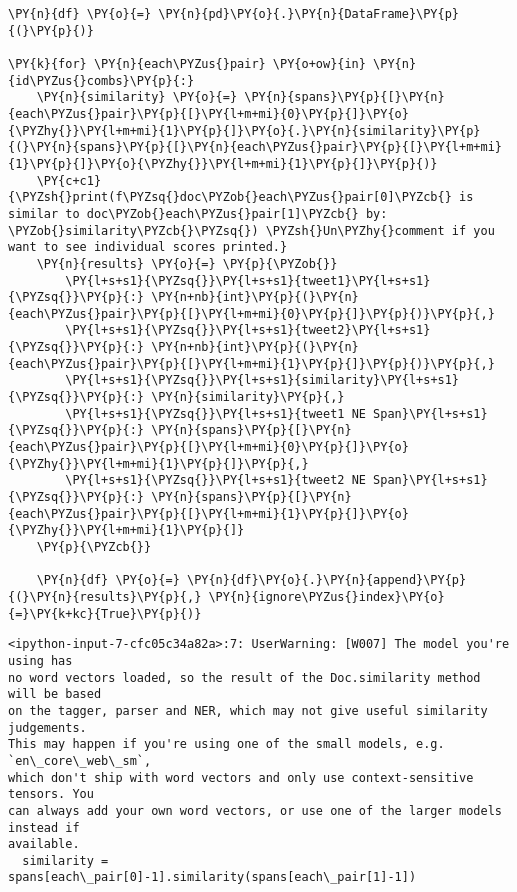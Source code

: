     \begin{tcolorbox}[breakable, size=fbox, boxrule=1pt, pad at break*=1mm,colback=cellbackground, colframe=cellborder]
\begin{Verbatim}[commandchars=\\\{\}]
\PY{n}{df} \PY{o}{=} \PY{n}{pd}\PY{o}{.}\PY{n}{DataFrame}\PY{p}{(}\PY{p}{)}

\PY{k}{for} \PY{n}{each\PYZus{}pair} \PY{o+ow}{in} \PY{n}{id\PYZus{}combs}\PY{p}{:}
    \PY{n}{similarity} \PY{o}{=} \PY{n}{spans}\PY{p}{[}\PY{n}{each\PYZus{}pair}\PY{p}{[}\PY{l+m+mi}{0}\PY{p}{]}\PY{o}{\PYZhy{}}\PY{l+m+mi}{1}\PY{p}{]}\PY{o}{.}\PY{n}{similarity}\PY{p}{(}\PY{n}{spans}\PY{p}{[}\PY{n}{each\PYZus{}pair}\PY{p}{[}\PY{l+m+mi}{1}\PY{p}{]}\PY{o}{\PYZhy{}}\PY{l+m+mi}{1}\PY{p}{]}\PY{p}{)}
    \PY{c+c1}{\PYZsh{}print(f\PYZsq{}doc\PYZob{}each\PYZus{}pair[0]\PYZcb{} is similar to doc\PYZob{}each\PYZus{}pair[1]\PYZcb{} by: \PYZob{}similarity\PYZcb{}\PYZsq{}) \PYZsh{}Un\PYZhy{}comment if you want to see individual scores printed.}
    \PY{n}{results} \PY{o}{=} \PY{p}{\PYZob{}}
        \PY{l+s+s1}{\PYZsq{}}\PY{l+s+s1}{tweet1}\PY{l+s+s1}{\PYZsq{}}\PY{p}{:} \PY{n+nb}{int}\PY{p}{(}\PY{n}{each\PYZus{}pair}\PY{p}{[}\PY{l+m+mi}{0}\PY{p}{]}\PY{p}{)}\PY{p}{,}
        \PY{l+s+s1}{\PYZsq{}}\PY{l+s+s1}{tweet2}\PY{l+s+s1}{\PYZsq{}}\PY{p}{:} \PY{n+nb}{int}\PY{p}{(}\PY{n}{each\PYZus{}pair}\PY{p}{[}\PY{l+m+mi}{1}\PY{p}{]}\PY{p}{)}\PY{p}{,}
        \PY{l+s+s1}{\PYZsq{}}\PY{l+s+s1}{similarity}\PY{l+s+s1}{\PYZsq{}}\PY{p}{:} \PY{n}{similarity}\PY{p}{,}
        \PY{l+s+s1}{\PYZsq{}}\PY{l+s+s1}{tweet1 NE Span}\PY{l+s+s1}{\PYZsq{}}\PY{p}{:} \PY{n}{spans}\PY{p}{[}\PY{n}{each\PYZus{}pair}\PY{p}{[}\PY{l+m+mi}{0}\PY{p}{]}\PY{o}{\PYZhy{}}\PY{l+m+mi}{1}\PY{p}{]}\PY{p}{,}
        \PY{l+s+s1}{\PYZsq{}}\PY{l+s+s1}{tweet2 NE Span}\PY{l+s+s1}{\PYZsq{}}\PY{p}{:} \PY{n}{spans}\PY{p}{[}\PY{n}{each\PYZus{}pair}\PY{p}{[}\PY{l+m+mi}{1}\PY{p}{]}\PY{o}{\PYZhy{}}\PY{l+m+mi}{1}\PY{p}{]}
    \PY{p}{\PYZcb{}}
    
    \PY{n}{df} \PY{o}{=} \PY{n}{df}\PY{o}{.}\PY{n}{append}\PY{p}{(}\PY{n}{results}\PY{p}{,} \PY{n}{ignore\PYZus{}index}\PY{o}{=}\PY{k+kc}{True}\PY{p}{)}
\end{Verbatim}
\end{tcolorbox}

    \begin{Verbatim}[commandchars=\\\{\}]
<ipython-input-7-cfc05c34a82a>:7: UserWarning: [W007] The model you're using has
no word vectors loaded, so the result of the Doc.similarity method will be based
on the tagger, parser and NER, which may not give useful similarity judgements.
This may happen if you're using one of the small models, e.g. `en\_core\_web\_sm`,
which don't ship with word vectors and only use context-sensitive tensors. You
can always add your own word vectors, or use one of the larger models instead if
available.
  similarity = spans[each\_pair[0]-1].similarity(spans[each\_pair[1]-1])
    \end{Verbatim}

